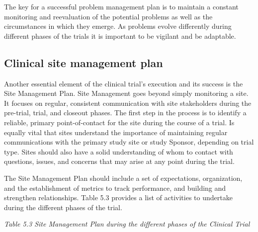 \documentclass[]{book}
\theoremstyle{definition}
\theoremstyle{definition}
\theoremstyle{definition}
\theoremstyle{remark}
\begin{document}
The key for a successful problem management plan is to maintain a
constant monitoring and reevaluation of the potential problems as well
as the circumstances in which they emerge. As problems evolve
differently during different phases of the trials it is important to be
vigilant and be adaptable.

\subsection{Clinical site management
plan}\label{clinical-site-management-plan}

Another essential element of the clinical trial's execution and its
success is the Site Management Plan. Site Management goes beyond simply
monitoring a site. It focuses on regular, consistent communication with
site stakeholders during the pre-trial, trial, and closeout phases. The
first step in the process is to identify a reliable, primary
point-of-contact for the site during the course of a trial. Is equally
vital that sites understand the importance of maintaining regular
communications with the primary study site or study Sponsor, depending
on trial type. Sites should also have a solid understanding of whom to
contact with questions, issues, and concerns that may arise at any point
during the trial.

The Site Management Plan should include a set of expectations,
organization, and the establishment of metrics to track performance, and
building and strengthen relationships. Table 5.3 provides a list of
activities to undertake during the different phases of the trial.

\emph{Table 5.3 Site Management Plan during the different phases of the
Clinical Trial}
\end{document}
